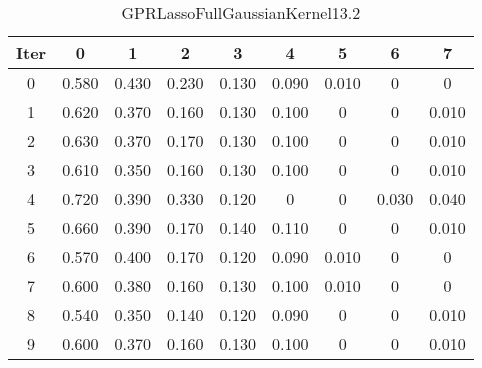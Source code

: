 \begin{table}
	\begin{center}
		\begin{tabular}{|c|c|c|c|c|c|c|c|c|}
			\hline
			Iter & 0 & 1 & 2 & 3 & 4 & 5 & 6 & 7 \\
			\hline
			0 & 0.580 & 0.430 & 0.230 & 0.130 & 0.090 & 0.010 & 0 & 0 \\
			\hline
			1 & 0.620 & 0.370 & 0.160 & 0.130 & 0.100 & 0 & 0 & 0.010 \\
			\hline
			2 & 0.630 & 0.370 & 0.170 & 0.130 & 0.100 & 0 & 0 & 0.010 \\
			\hline
			3 & 0.610 & 0.350 & 0.160 & 0.130 & 0.100 & 0 & 0 & 0.010 \\
			\hline
			4 & 0.720 & 0.390 & 0.330 & 0.120 & 0 & 0 & 0.030 & 0.040 \\
			\hline
			5 & 0.660 & 0.390 & 0.170 & 0.140 & 0.110 & 0 & 0 & 0.010 \\
			\hline
			6 & 0.570 & 0.400 & 0.170 & 0.120 & 0.090 & 0.010 & 0 & 0 \\
			\hline
			7 & 0.600 & 0.380 & 0.160 & 0.130 & 0.100 & 0.010 & 0 & 0 \\
			\hline
			8 & 0.540 & 0.350 & 0.140 & 0.120 & 0.090 & 0 & 0 & 0.010 \\
			\hline
			9 & 0.600 & 0.370 & 0.160 & 0.130 & 0.100 & 0 & 0 & 0.010 \\
			\hline
		\end{tabular}
	\end{center}
	\caption{GPRLassoFullGaussianKernel13.2}
\end{table}